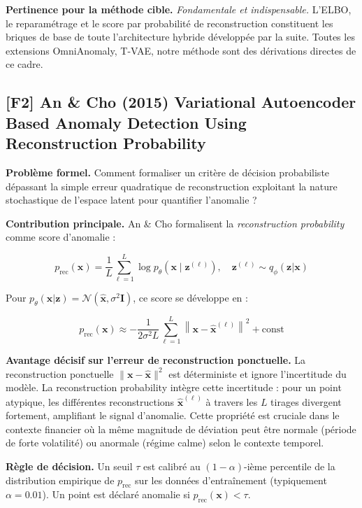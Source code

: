 \documentclass[12pt,a4paper]{article}
\begin{document}
\textbf{Pertinence pour la méthode cible.} \textit{Fondamentale et indispensable.} L'ELBO, le reparamétrage et le score par probabilité de reconstruction constituent les briques de base de toute l'architecture hybride développée par la suite. Toutes les extensions  OmniAnomaly, T-VAE, notre méthode  sont des dérivations directes de ce cadre.

\subsection{[F2] An \& Cho (2015)  Variational Autoencoder Based Anomaly Detection Using Reconstruction Probability}

\textbf{Problème formel.} Comment formaliser un critère de décision probabiliste  dépassant la simple erreur quadratique de reconstruction  exploitant la nature stochastique de l'espace latent pour quantifier l'anomalie ?

\textbf{Contribution principale.} An \& Cho formalisent la \textit{reconstruction probability} comme score d'anomalie :

$$p_{\mathrm{rec}}(\mathbf{x}) = \frac{1}{L}\sum_{\ell=1}^{L}\log p_\theta\!\left(\mathbf{x}\mid\mathbf{z}^{(\ell)}\right), \quad \mathbf{z}^{(\ell)} \sim q_\phi(\mathbf{z}|\mathbf{x})$$

Pour $p_\theta(\mathbf{x}|\mathbf{z}) = \mathcal{N}(\hat{\mathbf{x}},\sigma^2\mathbf{I})$, ce score se développe en :

$$p_{\mathrm{rec}}(\mathbf{x}) \approx -\frac{1}{2\sigma^2 L}\sum_{\ell=1}^{L}\left\|\mathbf{x} - \hat{\mathbf{x}}^{(\ell)}\right\|^2 + \mathrm{const}$$

\textbf{Avantage décisif sur l'erreur de reconstruction ponctuelle.} La reconstruction ponctuelle $\|\mathbf{x} - \hat{\mathbf{x}}\|^2$ est déterministe et ignore l'incertitude du modèle. La reconstruction probability intègre cette incertitude : pour un point atypique, les différentes reconstructions $\hat{\mathbf{x}}^{(\ell)}$ à travers les $L$ tirages divergent fortement, amplifiant le signal d'anomalie. Cette propriété est cruciale dans le contexte financier où la même magnitude de déviation peut être normale (période de forte volatilité) ou anormale (régime calme) selon le contexte temporel.

\textbf{Règle de décision.} Un seuil $\tau$ est calibré au $(1-\alpha)$-ième percentile de la distribution empirique de $p_{\mathrm{rec}}$ sur les données d'entraînement (typiquement $\alpha = 0.01$). Un point est déclaré anomalie si $p_{\mathrm{rec}}(\mathbf{x}) < \tau$.
\end{document}
